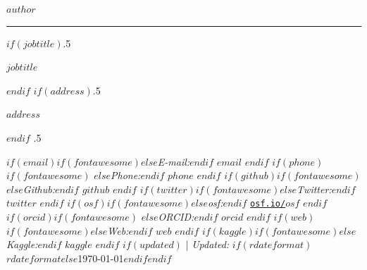 \usepackage{datetime}

\usepackage{orcidlink}
\usepackage{academicons}
\newcommand{\orcid}[1]{\href{https://orcid.org/#1}{\textcolor[HTML]{A6CE39}{\aiOrcid}}}



\centerline{\huge \bf $author$}

\vspace{2 mm}

\hrule

\vspace{2 mm}

$if(jobtitle)$\moveleft.5\hoffset\centerline{$jobtitle$}$endif$
$if(address)$\moveleft.5\hoffset\centerline{$address$}$endif$
\moveleft.5\hoffset\centerline{ 
$if(email)$$if(fontawesome)$\faEnvelope \hspace{1 mm}$else$\emph{E-mail:}$endif$ \href{mailto:lauren.3.price@gmail.com}{\tt $email$} \hspace{1 mm}$endif$ 
$if(phone)$$if(fontawesome)$ \faPhone \hspace{1 mm}$else$\emph{Phone:}$endif$  $phone$  \hspace{1 mm} $endif$ 
$if(github)$$if(fontawesome)$\faGithub \hspace{1 mm}$else$\emph{Github:}$endif$ \href{http://github.com/pricele2}{\tt $github$} \hspace{1 mm} $endif$  
$if(twitter)$$if(fontawesome)$\faTwitter \hspace{1 mm}$else$\emph{Twitter:}$endif$ \href{https:/twitter.com/$twitter$}{\tt $twitter$} \hspace{1 mm} $endif$ 
$if(osf)$$if(fontawesome)$\faUnlock \hspace{1 mm}$else$\emph{osf:}$endif$ \href{https:/osf.io/$osf$}{\tt osf.io/$osf$} \hspace{1 mm} $endif$ 
$if(orcid)$$if(fontawesome)$ \hspace{.5 mm}$else$\emph{ORCID:}$endif$ \href{https://orcid.org/$orcid$}{\tt $orcid$} \hspace{1 mm} $endif$ 
$if(web)$$if(fontawesome)$\faGlobe \hspace{1 mm}$else$\emph{Web:}$endif$ \href{https://www.linkedin.com/in/lauren-e-price-mpp/}{\tt $web$}  $endif$ 
$if(kaggle)$$if(fontawesome)$\faKaggle \hspace{1 mm}$else$\emph{Kaggle:}$endif$ \href{http://kaggle.com/$kaggle$}{\tt $kaggle$} \hspace{1 mm} $endif$   
$if(updated)$ | \emph{Updated:} $if(rdateformat)$$rdateformat$$else$\apstylekinda\today$endif$$endif$}

